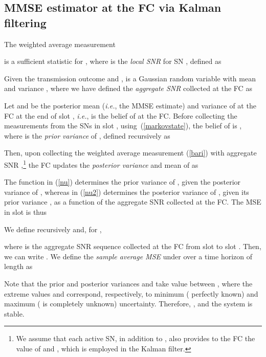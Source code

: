 \documentclass[10pt,twocolumn,twoside]{IEEEtran}
\theoremstyle{plain}
\begin{document}
\subsection{MMSE estimator at the FC via Kalman filtering}
\label{P3}
\noindent The weighted average measurement
   
   is a sufficient statistic for ,
   where  is the \emph{local SNR} for SN , defined as
   
    Given the transmission outcome and ,
    is a Gaussian random variable with mean  and variance
   ,
where we have defined the \emph{aggregate SNR} collected at the FC as



 Let  and  be the posterior mean (\emph{i.e.}, the MMSE estimate)
and variance of  at the FC at the end of slot ,
\emph{i.e.},  is the belief of  at the FC.
 Before collecting the measurements from the SNs in slot ,
 using~(\ref{markovstate}),
 the belief of  is ,
 where  is the \emph{prior variance} of ,
defined recursively as

Then, upon collecting the weighted average measurement  (\ref{bari})
 with aggregate SNR ,\footnote{We assume that each active SN, in addition to , also provides to the FC the value of 
and , which is employed in the Kalman filter.}
the FC updates the \emph{posterior variance}  and  mean  of  as

The function  in (\ref{nu}) determines  the prior variance of , given the posterior variance of ,
whereas  in (\ref{nu2}) determines the posterior variance of , given its prior variance ,
as a function of the aggregate SNR  collected at the FC.
The MSE in slot  is thus

We define recursively 
and, for ,

where  is the aggregate SNR sequence collected at the FC
from slot  to slot . Then,
we can write .
We define the \emph{sample average MSE} under  over a time horizon of length  as

Note that the prior and posterior variances  and  take value between ,
where the extreme values  and  correspond, respectively, to
 minimum ( perfectly known) and maximum ( is completely unknown) uncertainty.
Therefore, , and the system is stable.
\vspace{-4mm}
\end{document}
